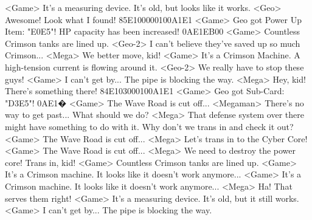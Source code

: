 <Game> It's a measuring device. It's old, but looks like it works. 
<Geo> Awesome! Look what I found! 
{85}{E1}{00}{00}{01}{00}{A1}{E1} 
<Game> Geo got Power Up Item: "{E0}{E5}"! 
HP capacity has been increased! 
{0A}{E1}{EB}{00}
<Game> Countless Crimson tanks are lined up. 
<Geo-2> I can't believe they've saved up so much Crimson... 
<Mega> We better move, kid! 
<Game> It's a Crimson Machine. A high-tension current is flowing around it. 
<Geo-2> We really have to stop these guys! 
<Game> I can't get by... The pipe is blocking the way. 
<Mega> Hey, kid! There's something there! 
{84}{E1}{03}{00}{01}{00}{A1}{E1} 
<Game> Geo got Sub-Card: "{D3}{E5}"! 
{0A}{E1}�
<Game> The Wave Road is cut off... 
<Megaman> There's no way to get past... What should we do? 
<Mega> That defense system over there might have something 
to do with it. Why don't we trans in and check it out? 
<Game> The Wave Road is cut off... 
<Mega> Let's trans in to the Cyber Core! 
<Game> The Wave Road is cut off... 
<Mega> We need to destroy the power core! Trans in, kid! 
<Game> Countless Crimson tanks are lined up. 
<Game> It's a Crimson machine. It looks like it doesn't work anymore... 
<Game> It's a Crimson machine. It looks like it doesn't work anymore... 
<Mega> Ha! That serves them right! 
<Game> It's a measuring device. It's old, but it still works. 
<Game> I can't get by... The pipe is blocking the way. 
